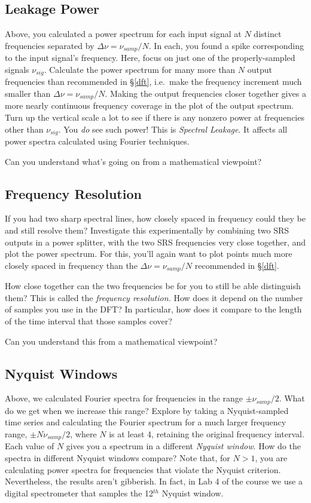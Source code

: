 \documentclass[12pt,preprint]{aastex}
\begin{document}
\subsection{Leakage Power} \label{subleakage}

Above, you calculated a power spectrum for each input signal at $N$
distinct frequencies separated by $\Delta \nu = \nu_{samp}/N$. In each,
you found a spike corresponding to the input signal's frequency. Here,
focus on just one of the properly-sampled signals $\nu_{sig}$. Calculate
the power spectrum for many more than $N$ output frequencies than
recommended in \S \ref{dft}, i.e.\ make the
frequency increment much smaller than $\Delta \nu = \nu_{samp}/N$.
Making the output frequencies closer together gives a more nearly
continuous frequency coverage in the plot of the output spectrum.  Turn
up the vertical scale a lot to see if there is any nonzero power at
frequencies other than $\nu_{sig}$.  You {\it do} see such power! This
is {\it Spectral Leakage}. It affects all power spectra calculated using
Fourier techniques. 

Can you understand what's going on from a mathematical viewpoint?

\subsection{Frequency Resolution} \label{freqres}

If you had two sharp spectral lines, how closely spaced in frequency
could they be and still resolve them? Investigate this experimentally by
combining two SRS outputs in a power splitter, with the two SRS
frequencies very close together, and plot the power spectrum. For this,
you'll again want to plot points much more closely spaced in frequency
than the $\Delta \nu = \nu_{samp}/N$ recommended in \S \ref{dft}.  

How close together can the two frequencies be for you to still be able
distinguish them? This is called the {\it frequency resolution.} How
does it depend on the number of samples you use in the DFT? In
particular, how does it compare to the length of the time interval that
those samples cover?

Can you understand this from a mathematical viewpoint?

\subsection{Nyquist Windows}

Above, we calculated Fourier spectra for frequencies in the range $\pm
\nu_{samp}/2$. What do we get when we increase this range? Explore by
taking a Nyquist-sampled time series and calculating the Fourier
spectrum for a much larger frequency range, $\pm N \nu_{samp}/2$, where
$N$ is at least 4, retaining the original frequency interval. Each value
of $N$ gives you a spectrum in a different {\it Nyquist window}. How do
the spectra in different Nyquist windows compare? Note that, for $N>1$,
you are calculating power spectra for frequencies that violate the
Nyquist criterion. Nevertheless, the results aren't gibberish. In fact,
in Lab 4 of the course we use a digital spectrometer that samples the
12$^{th}$ Nyquist window.
\end{document}
